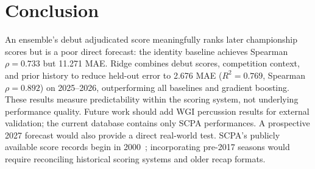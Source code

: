 \section{Conclusion}
\label{sec:conclusion}

An ensemble's debut adjudicated score meaningfully ranks later championship
scores but is a poor direct forecast: the identity baseline achieves Spearman
$\rho = 0.733$ but 11.271 MAE. Ridge combines debut scores, competition
context, and prior history to reduce held-out error to 2.676 MAE
($R^2 = 0.769$, Spearman $\rho = 0.892$) on 2025--2026, outperforming all
baselines and gradient boosting. These results measure predictability within
the scoring system, not underlying performance quality. Future work should add
WGI percussion results for external validation; the current database contains only SCPA performances. A prospective 2027 forecast would also provide a direct real-world test.
SCPA's publicly available score records begin in
2000~\cite{scpaabout2026}; incorporating pre-2017 seasons would require
reconciling historical scoring systems and older recap formats.
